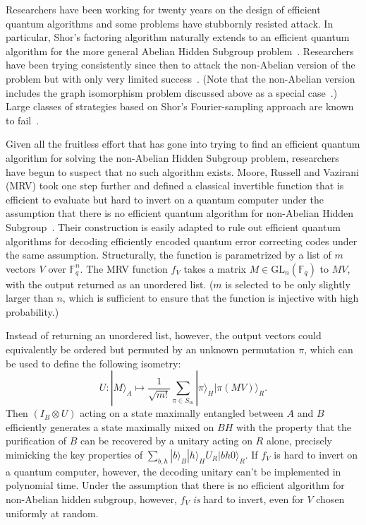 \documentclass[12pt]{article}
\newcommand{\textcs}[1]{\textsf{#1}}
\begin{document}
Researchers have been working for twenty years on the design of efficient quantum algorithms and some problems have stubbornly resisted attack. In particular, Shor's factoring algorithm naturally extends to an efficient quantum algorithm for the more general \textcs{Abelian Hidden Subgroup} problem~\cite{kitaev1995quantum}. Researchers have been trying consistently since then to attack the non-Abelian version of the problem but with only very limited success~\cite{bacon2005optimal,kuperberg2005subexponential,ivanyos2008efficient}. (Note that the non-Abelian version includes the graph isomorphism problem discussed above as a special case~\cite{ettinger1999quantum}.) Large classes of strategies based on Shor's Fourier-sampling approach are known to fail~\cite{moore2008symmetric,moore2010impossibility}. 

Given all the fruitless effort that has gone into trying to find an efficient quantum algorithm for solving the \textcs{non-Abelian Hidden Subgroup} problem, researchers have begun to suspect that no such algorithm exists. Moore, Russell and Vazirani (MRV) took one step further and defined a classical invertible function that is efficient to evaluate but hard to invert on a quantum computer under the assumption that there is no efficient quantum algorithm for \textcs{non-Abelian Hidden Subgroup}~\cite{moore2007classical}. Their construction is easily adapted to rule out efficient quantum algorithms for decoding efficiently encoded quantum error correcting codes under the same assumption.
%
Structurally, the function is parametrized by a list of $m$ vectors $V$ over $\mathbb{F}_q^n$. The MRV function $f_V$ takes a matrix $M \in \text{GL}_n(\mathbb{F}_q)$ to $MV$, with the output returned as an unordered list. ($m$ is selected to be only slightly larger than $n$, which is sufficient to ensure that the function is injective with high probability.) 

Instead of returning an unordered list, however, the output vectors could equivalently be ordered but permuted by an unknown permutation $\pi$, which can be used to define the following isometry:
\begin{equation}
U : |{M}\rangle_A \mapsto \frac{1}{\sqrt{m!}} \sum_{\pi \in S_m} |\pi\rangle_H |\pi(MV)\rangle_R.
\end{equation}
Then
$(I_B \otimes U)$ acting on a state maximally entangled between $A$ and $B$ efficiently generates a state maximally mixed on $BH$ with the property that the purification of $B$ can be recovered by a unitary acting on $R$ alone, precisely mimicking the key properties of $\sum_{b,h} |b\rangle_B |h\rangle_H U_R |bh0\rangle_R$. If $f_V$ is hard to invert on a quantum computer, however, the decoding unitary can't be implemented in polynomial time. Under the assumption that there is no efficient algorithm for \textcs{non-Abelian hidden subgroup}, however, $f_V$ \emph{is} hard to invert, even for $V$ chosen uniformly at random.
\end{document}
